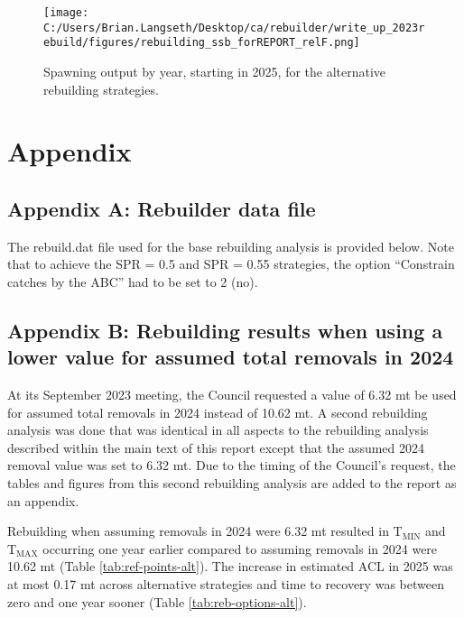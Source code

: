 \documentclass[11pt,
  letterpaper,
]{article}
\begin{document}
\begin{figure}
\centering
\texttt{[image: C:/Users/Brian.Langseth/Desktop/ca/rebuilder/write\_up\_2023rebuild/figures/rebuilding\_ssb\_forREPORT\_relF.png]}
\caption{Spawning output by year, starting in 2025, for the alternative rebuilding strategies.\label{fig:ssb-fig}}
\end{figure}

\clearpage

\clearpage

\hypertarget{appendix}{%
\section{Appendix}\label{appendix}}

\hypertarget{append_a}{%
\subsection{Appendix A: Rebuilder data file}\label{append_a}}

The rebuild.dat file used for the base rebuilding analysis is provided below. Note that to achieve the SPR = 0.5 and SPR = 0.55 strategies, the option ``Constrain catches by the ABC'' had to be set to 2 (no).

\clearpage

\hypertarget{append_b}{%
\subsection{Appendix B: Rebuilding results when using a lower value for assumed total removals in 2024}\label{append_b}}

At its September 2023 meeting, the Council requested a value of 6.32 mt be used for assumed total removals in 2024 instead of 10.62 mt. A second rebuilding analysis was done that was identical in all aspects to the rebuilding analysis described within the main text of this report except that the assumed 2024 removal value was set to 6.32 mt. Due to the timing of the Council's request, the tables and figures from this second rebuilding analysis are added to the report as an appendix.

Rebuilding when assuming removals in 2024 were 6.32 mt resulted in \(\text{T}_\text{MIN}\) and \(\text{T}_\text{MAX}\) occurring one year earlier compared to assuming removals in 2024 were 10.62 mt (Table \ref{tab:ref-points-alt}). The increase in estimated ACL in 2025 was at most 0.17 mt across alternative strategies and time to recovery was between zero and one year sooner (Table \ref{tab:reb-options-alt}).
\end{document}
